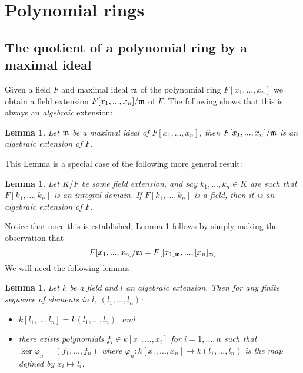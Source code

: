\documentclass[12pt]{article}
\theoremstyle{plain}
\newtheorem{lemma}[thm]{Lemma}
\theoremstyle{definition}
\begin{document}
	\section{Polynomial rings}
	\subsection{The quotient of a polynomial ring by a maximal ideal}
	\label{subsec:quotient_polynomial}
	Given a field $F$ and maximal ideal $\frak{m}$ of the polynomial ring $F[x_1,...,x_n]$ we obtain a field extension $F[x_1,...,x_n]/\frak{m}$ of $F$. The following shows that this is always an \emph{algebraic} extension:
	\begin{lemma}
		\label{lem:algebraic}
		Let $\frak{m}$ be a maximal ideal of $F[x_1,...,x_n]$, then $F[x_1,...,x_n]/\frak{m}$ is an algebraic extension of $F$.
	\end{lemma}
	This Lemma is a special case of the following more general result:
	\begin{lemma}
		\label{converse}
		Let $K/F$ be some field extension, and say $k_1,...,k_n \in K$ are such that $F[k_1,...,k_n]$ is an integral domain. If $F[k_1,...,k_n]$ is a field, then it is an algebraic extension of $F$.
	\end{lemma}
	Notice that once this is established, Lemma \ref{lem:algebraic} follows by simply making the observation that $$F[x_1,...,x_n]/\frak{m} = F[[x_1]_{\frak{m}},...,[x_n]_{\frak{m}}]$$
	We will need the following lemmas:
	\begin{lemma}
		\label{lem:extension}
		Let $k$ be a field and $l$ an algebraic extension. Then for any finite sequence of elements in $l$, $(l_1,...,l_n)$:
		\begin{itemize}
			\item $k[l_1,...,l_n] = k(l_1,...,l_n)$, and
			\item there exists polynomials $f_i \in k[x_1,...,x_i]$ for $i= 1,...,n$ such that $\operatorname{ker}\varphi_n = (f_1,...,f_n)$ where $\varphi_n: k[x_1,...,x_n] \to k(l_1,...,l_n)$ is the map defined by $x_i \mapsto l_i$.
		\end{itemize}
	\end{lemma}
\end{document}

